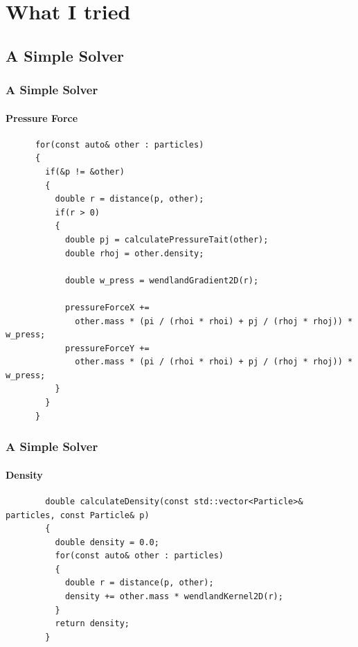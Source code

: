 \documentclass[notheorems, aspectratio=169]{beamer}
\begin{document}
  \section{What I tried} 
  \frame{\tableofcontents[currentsection]}

  \subsection{A Simple Solver}
      
  \begin{frame}[fragile]
    \frametitle{A Simple Solver}
    \framesubtitle{Pressure Force}
    
    \begin{lstlisting}
      for(const auto& other : particles)
      {
        if(&p != &other)
        {
          double r = distance(p, other);
          if(r > 0)
          {
            double pj = calculatePressureTait(other);
            double rhoj = other.density;
  
            double w_press = wendlandGradient2D(r); 
  
            pressureForceX +=
              other.mass * (pi / (rhoi * rhoi) + pj / (rhoj * rhoj)) * w_press;
            pressureForceY +=
              other.mass * (pi / (rhoi * rhoi) + pj / (rhoj * rhoj)) * w_press;
          }
        }
      }
    \end{lstlisting}
    
    \end{frame}


    \begin{frame}[fragile]
      \frametitle{A Simple Solver}
      \framesubtitle{Density}
      
      \begin{lstlisting}
        double calculateDensity(const std::vector<Particle>& particles, const Particle& p)
        {
          double density = 0.0;
          for(const auto& other : particles)
          {
            double r = distance(p, other);
            density += other.mass * wendlandKernel2D(r);
          }
          return density;
        }
      \end{lstlisting}
      
      \end{frame}
      
    
      
\end{document}
